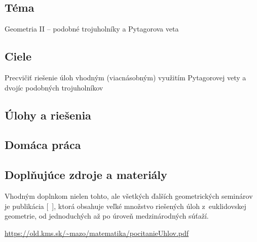 
\subsection*{Téma}
Geometria II -- podobné trojuholníky a Pytagorova veta

\subsection*{Ciele}
Precvičiť riešenie úloh vhodným (viacnásobným) využitím Pytagorovej vety a dvojíc podobných trojuholníkov

\subsection*{Úlohy a riešenia}

















\subsection*{Domáca práca}






\subsection*{Doplňujúce zdroje a materiály}
Vhodným doplnkom nielen tohto, ale všetkých ďalších geometrických seminárov je publikácia [~\cite{andreescu2013}], ktorá obsahuje veľké množstvo riešených úloh z~euklidovskej geometrie, od jednoduchých až po úroveň medzinárodných súťaží.

\url{https://old.kms.sk/~mazo/matematika/pocitanieUhlov.pdf}

